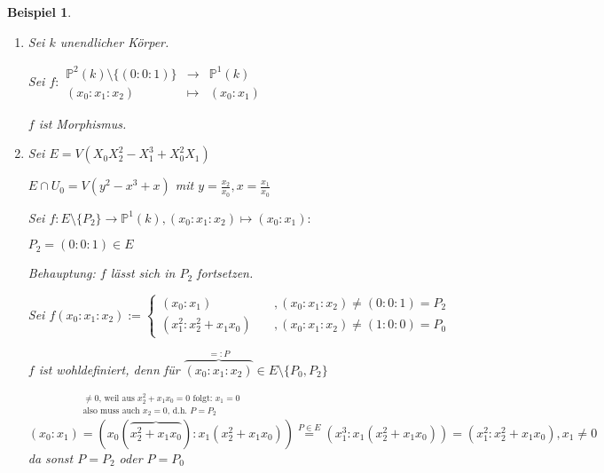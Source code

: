 \documentclass[a4paper, 12pt, numbers=noendperiod, chapterprefix=true]{scrbook}
\theoremstyle{break}
\newtheorem{Bsp}[Def]{Beispiel}
\theoremstyle{nonumberbreak}
\theoremstyle{nonumberplain}
\newcommand{\IP}{\mathbb{P}}%
\begin{document}
\begin{Bsp}\begin{enumerate}[1)]
\item
	Sei $k$ unendlicher K\"orper.
	
	Sei $f:\begin{array}{rcl}\IP^2(k)\setminus\{(0:0:1)\} &\to& \IP^1(k)\\ (x_0:x_1:x_2) &\mapsto& (x_0:x_1)\end{array}$
	
	$f$ ist Morphismus.
\item
	Sei $E=V(X_0X_2^2-X_1^3+X_0^2X_1)$
	
	$E\cap U_0=V(y^2-x^3+x)$ mit $y=\frac{x_2}{x_0}, x=\frac{x_1}{x_0}$
	
	Sei $f:E\setminus\{P_2\}\to\IP^1(k), (x_0:x_1:x_2)\mapsto(x_0:x_1):$
	
	$P_2=(0:0:1)\in E$
	
	\emph{Behauptung}: $f$ l\"asst sich in $P_2$ fortsetzen.
	
	Sei $f(x_0:x_1:x_2):=\left\{\begin{array}{ll}
		(x_0:x_1) & \quad ,(x_0:x_1:x_2)\not=(0:0:1)=P_2\\
		(x_1^2:x_2^2+x_1x_0) & \quad ,(x_0:x_1:x_2)\not=(1:0:0)=P_0\end{array}\right.$
		
	$f$ ist wohldefiniert, denn f\"ur $\overbrace{(x_0:x_1:x_2)}^{=:P}\in E\setminus\{P_0,P_2\}$
	
	$\overset{\substack{\ne0\text{, weil aus }x_2^2+x_1x_0=0 \text{ folgt: }x_1=0\\\text{also muss auch }x_2=0\text{, d.h. }P=P_2}}{(x_0:x_1)=(x_0(\overbrace{x_2^2+x_1x_0}):x_1(x_2^2+x_1x_0))}\overset{P\in E}{=}(x_1^3:x_1(x_2^2+x_1x_0))=(x_1^2:x_2^2+x_1x_0), x_1\ne0$ da sonst $P=P_2$ oder $P=P_0$
\end{enumerate}\end{Bsp}
\end{document}
